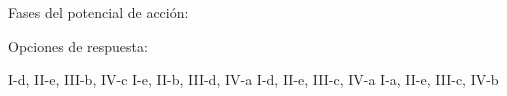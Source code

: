 \documentclass[12pt, letter]{exam}
\begin{document}
\begin{questions}
    Fases del potencial de acción:
    \renewcommand{\thepartno}{\alph{partno}}
    \begin{multicols}{2}
    \end{multicols}

    Opciones de respuesta:
    \begin{multicols}{2}
    \begin{tasks}
        \task I-d, II-e, III-b, IV-c
        \task I-e, II-b, III-d, IV-a
        \task I-d, II-e, III-c, IV-a
        \task I-a, II-e, III-c, IV-b
    \end{tasks}
    \end{multicols}

\end{questions}

\newpage
\end{document}
